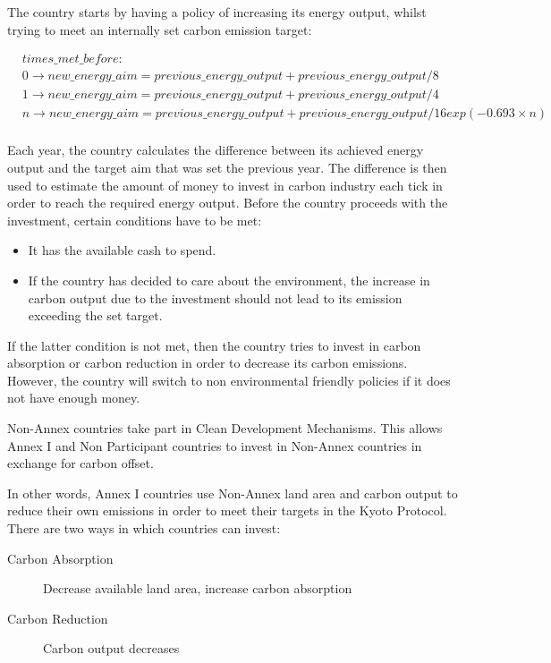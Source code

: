 The country starts by having a policy of increasing its energy output, whilst trying to meet an internally set carbon emission target:

%
% 

\begin{align*}
	&times\_met\_before: \\
	&0 \rightarrow new\_energy\_aim = previous\_energy\_output + previous\_energy\_output / 8\\
	&1 \rightarrow new\_energy\_aim = previous\_energy\_output + previous\_energy\_output / 4\\
	&n \rightarrow new\_energy\_aim = previous\_energy\_output + previous\_energy\_output / 16exp(-0.693 \times n)\\
\end{align*}

Each year, the country calculates the difference between its achieved energy output and the target aim that was set the previous year. The difference is then used to estimate the amount of money to invest in carbon industry each tick in order to reach the required energy output. Before the country proceeds with the investment, certain conditions have to be met:

\begin{itemize}
	\item It has the available cash to spend.
	\item If the country has decided to care about the environment, the increase in carbon output due to the investment should not lead to its emission exceeding the set target.
\end{itemize}

If the latter condition is not met, then the country tries to invest in carbon absorption or carbon reduction in order to decrease its carbon emissions. However, the country will switch to non environmental friendly policies if it does not have enough money.
 
Non-Annex countries take part in Clean Development Mechanisms. This allows Annex I and Non Participant countries to invest in Non-Annex countries in exchange for carbon offset.

In other words, Annex I countries use Non-Annex land area and carbon output to reduce their own emissions in order to meet their targets in the Kyoto Protocol. There are two ways in which countries can invest:
 
\begin{description}
	\item[Carbon Absorption] Decrease available land area, increase carbon absorption
	\item[Carbon Reduction] Carbon output decreases
\end{description}
 
